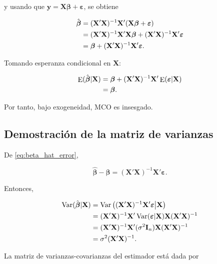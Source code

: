 \documentclass[11pt,a4paper]{article}
\DeclareMathOperator{\E}{E}
\DeclareMathOperator{\Var}{Var}
\begin{document}
y usando que \(\mathbf{y}=\mathbf{X}\boldsymbol{\beta}+\boldsymbol{\varepsilon}\), se obtiene

\begin{align}
\hat{\boldsymbol{\beta}}
&=(\mathbf{X}'\mathbf{X})^{-1}\mathbf{X}'(\mathbf{X}\boldsymbol{\beta}+\boldsymbol{\varepsilon}) \notag\\
&=(\mathbf{X}'\mathbf{X})^{-1}\mathbf{X}'\mathbf{X}\boldsymbol{\beta}
+(\mathbf{X}'\mathbf{X})^{-1}\mathbf{X}'\boldsymbol{\varepsilon} \notag\\
&=\boldsymbol{\beta}+(\mathbf{X}'\mathbf{X})^{-1}\mathbf{X}'\boldsymbol{\varepsilon}. \label{eq:beta_hat_error}
\end{align}

Tomando esperanza condicional en \(\mathbf{X}\):

\begin{align}
\E(\hat{\boldsymbol{\beta}}|\mathbf{X})
&=\boldsymbol{\beta}+(\mathbf{X}'\mathbf{X})^{-1}\mathbf{X}'\E(\boldsymbol{\varepsilon}|\mathbf{X}) \notag\\
&=\boldsymbol{\beta}. \notag
\end{align}

Por tanto, bajo exogeneidad, MCO es insesgado.

\subsection*{Demostración de la matriz de varianzas}

De \eqref{eq:beta_hat_error},

\[
\hat{\boldsymbol{\beta}}-\boldsymbol{\beta}=(\mathbf{X}'\mathbf{X})^{-1}\mathbf{X}'\boldsymbol{\varepsilon}.
\]

Entonces,

\begin{align}
\Var(\hat{\boldsymbol{\beta}}|\mathbf{X})
&=\Var\left((\mathbf{X}'\mathbf{X})^{-1}\mathbf{X}'\boldsymbol{\varepsilon}\middle|\mathbf{X}\right) \notag\\
&=(\mathbf{X}'\mathbf{X})^{-1}\mathbf{X}'\Var(\boldsymbol{\varepsilon}|\mathbf{X})\mathbf{X}(\mathbf{X}'\mathbf{X})^{-1} \notag\\
&=(\mathbf{X}'\mathbf{X})^{-1}\mathbf{X}'(\sigma^2\mathbf{I}_n)\mathbf{X}(\mathbf{X}'\mathbf{X})^{-1} \notag\\
&=\sigma^2(\mathbf{X}'\mathbf{X})^{-1}. \notag
\end{align}

La matriz de varianzas-covarianzas del estimador está dada por
\end{document}
